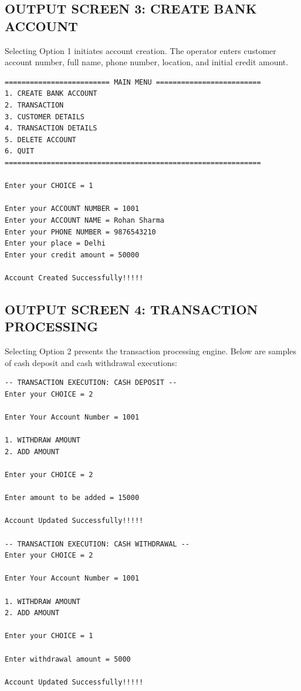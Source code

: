 \documentclass[12pt,a4paper]{article}
\begin{document}
\clearpage

\subsection*{OUTPUT SCREEN 3: CREATE BANK ACCOUNT}
Selecting Option 1 initiates account creation. The operator enters customer account number, full name, phone number, location, and initial credit amount.

\vspace{0.6em}
\begin{lstlisting}
========================= MAIN MENU =========================
1. CREATE BANK ACCOUNT
2. TRANSACTION
3. CUSTOMER DETAILS
4. TRANSACTION DETAILS
5. DELETE ACCOUNT
6. QUIT
=============================================================

Enter your CHOICE = 1

Enter your ACCOUNT NUMBER = 1001
Enter your ACCOUNT NAME = Rohan Sharma
Enter your PHONE NUMBER = 9876543210
Enter your place = Delhi
Enter your credit amount = 50000

Account Created Successfully!!!!!
\end{lstlisting}

\clearpage

\subsection*{OUTPUT SCREEN 4: TRANSACTION PROCESSING}
Selecting Option 2 presents the transaction processing engine. Below are samples of cash deposit and cash withdrawal executions:

\vspace{0.6em}
\begin{lstlisting}
-- TRANSACTION EXECUTION: CASH DEPOSIT --
Enter your CHOICE = 2

Enter Your Account Number = 1001

1. WITHDRAW AMOUNT
2. ADD AMOUNT

Enter your CHOICE = 2

Enter amount to be added = 15000

Account Updated Successfully!!!!!

-- TRANSACTION EXECUTION: CASH WITHDRAWAL --
Enter your CHOICE = 2

Enter Your Account Number = 1001

1. WITHDRAW AMOUNT
2. ADD AMOUNT

Enter your CHOICE = 1

Enter withdrawal amount = 5000

Account Updated Successfully!!!!!
\end{lstlisting}
\end{document}
